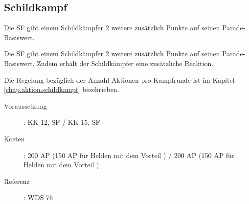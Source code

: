 \subsection{Schildkampf}
\label{sf.schildkampf}
Die SF  gibt einem Schildkämpfer 2 weitere zusätzlich Punkte auf seinen Parade-Basiswert.

Die SF  gibt einem Schildkämpfer 2 weitere zusätzlich Punkte auf seinen Parade-Basiswert.
Zudem erhält der Schildkämpfer eine zusätzliche Reaktion.

Die Regelung bezüglich der Anzahl Aktionen pro Kampfrunde ist im Kapitel \ref{chap.aktion.schildkampf} beschrieben.
\begin{description}
    \item[Voraussetzung]:
        KK 12, SF  / KK 15, SF 
    \item [Kosten]:
        200 AP (150 AP für Helden mit dem Vorteil ) / 200 AP (150 AP für Helden mit dem Vorteil )
    \item [Referenz]:
        WDS 76
\end{description}
